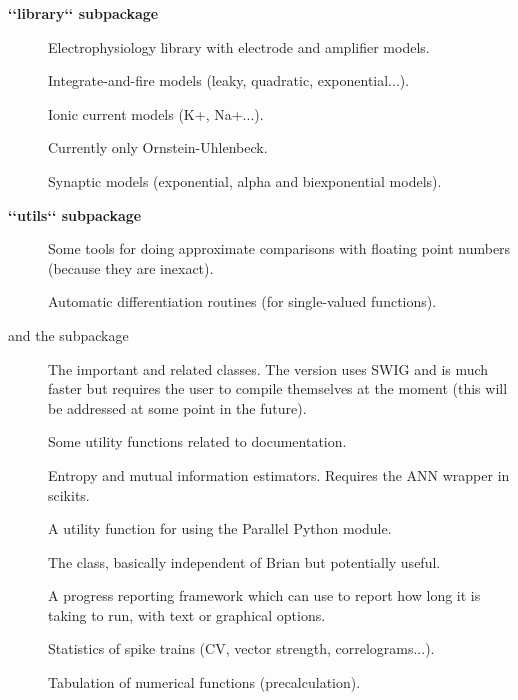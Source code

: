 \documentclass[letterpaper,10pt,english]{manual}
\begin{document}
\textbf{{}`{}`library{}`{}` subpackage}
\begin{description}
\item[]
Electrophysiology library with electrode and amplifier models.

\item[]
Integrate-and-fire models (leaky, quadratic, exponential...).

\item[]
Ionic current models (K+, Na+...).

\item[]
Currently only Ornstein-Uhlenbeck.

\item[]
Synaptic models (exponential, alpha and biexponential models).

\end{description}

\textbf{{}`{}`utils{}`{}` subpackage}
\begin{description}
\item[]
Some tools for doing approximate comparisons with floating point numbers
(because they are inexact).

\item[]
Automatic differentiation routines (for single-valued functions).

\item[ and the  subpackage]
The important  and related classes. The  version
uses SWIG and is much faster but requires the user to compile themselves
at the moment (this will be addressed at some point in the future).

\item[]
Some utility functions related to documentation.

\item[]
Entropy and mutual information estimators. Requires the ANN wrapper in scikits.

\item[]
A utility function for using the Parallel Python module.

\item[]
The  class, basically independent of Brian but
potentially useful.

\item[]
A progress reporting framework which  can use to report
how long it is taking to run, with text or graphical options.

\item[]
Statistics of spike trains (CV, vector strength, correlograms...).

\item[]
Tabulation of numerical functions (precalculation).

\end{description}
\end{document}
